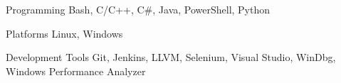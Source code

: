 
\begin{cvskills}

  \cvskill
    {Programming} %
    {Bash, C/C++, C\#, Java, PowerShell, Python} %

  \cvskill
    {Platforms} %
    {Linux, Windows} %

  \cvskill
    {Development Tools} %
    {Git, Jenkins, LLVM, Selenium, Visual Studio, WinDbg, Windows Performance Analyzer} %

\end{cvskills}
